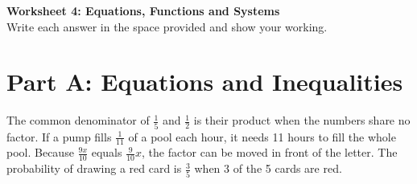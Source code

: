 \documentclass[11pt]{article}
\begin{document}
\begin{center}
{\Large\bfseries Worksheet 4: Equations, Functions and Systems}\\[4pt]
Write each answer in the space provided and show your working.
\end{center}
\section*{Part A: Equations and Inequalities}
The common denominator of \label{eq000}$\frac{1}{5}$ and \label{eq001}$\frac{1}{2}$ is their product when the numbers share no factor. If a pump fills \label{eq002}$\frac{1}{11}$ of a pool each hour, it needs 11 hours to fill the whole pool. Because \label{eq003}$\frac{9x}{10}$ equals \label{eq004}$\frac{9}{10}x$, the factor can be moved in front of the letter. The probability of drawing a red card is \label{eq005}$\frac{3}{5}$ when 3 of the 5 cards are red.
\end{document}
